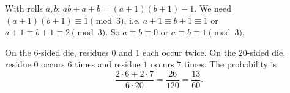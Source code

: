 With rolls $a,b$: $ab+a+b=(a+1)(b+1)-1$. We need $(a+1)(b+1)\equiv1\pmod3$, i.e. $a+1\equiv b+1\equiv1$ or $a+1\equiv b+1\equiv2\pmod 3$. So $a\equiv b\equiv0$ or $a\equiv b\equiv1\pmod3$.

On the $6$-sided die, residues $0$ and $1$ each occur twice. On the $20$-sided die, residue $0$ occurs $6$ times and residue $1$ occurs $7$ times. The probability is
\[\dfrac{2\cdot6+2\cdot7}{6\cdot20}=\dfrac{26}{120}=\boxed{\dfrac{13}{60}}.\]
